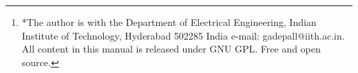 \documentclass[journal,12pt,twocolumn]{IEEEtran}
\begin{document}
\author{G V V Sharma$^{*}$%
\thanks{*The author is with the Department
of Electrical Engineering, Indian Institute of Technology, Hyderabad
502285 India e-mail:  gadepall@iith.ac.in. All content in this manual is released under GNU GPL.  Free and open source.}%
}
% 
%



% 







\maketitle
\end{document}
